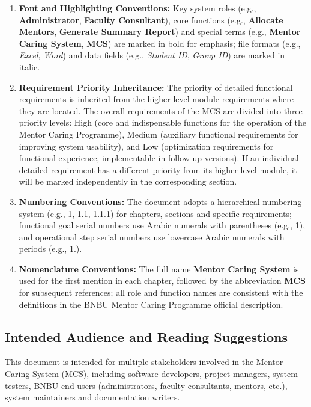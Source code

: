 \begin{enumerate}
\item \textbf{Font and Highlighting Conventions:} Key system roles (e.g., \textbf{Administrator}, \textbf{Faculty Consultant}), core functions (e.g., \textbf{Allocate Mentors}, \textbf{Generate Summary Report}) and special terms (e.g., \textbf{Mentor Caring System}, \textbf{MCS}) are marked in bold for emphasis; file formats (e.g., \textit{Excel}, \textit{Word}) and data fields (e.g., \textit{Student ID}, \textit{Group ID}) are marked in italic.

\item \textbf{Requirement Priority Inheritance:} The priority of detailed functional requirements is inherited from the higher-level module requirements where they are located. The overall requirements of the MCS are divided into three priority levels: High (core and indispensable functions for the operation of the Mentor Caring Programme), Medium (auxiliary functional requirements for improving system usability), and Low (optimization requirements for functional experience, implementable in follow-up versions). If an individual detailed requirement has a different priority from its higher-level module, it will be marked independently in the corresponding section.

\item \textbf{Numbering Conventions:} The document adopts a hierarchical numbering system (e.g., 1, 1.1, 1.1.1) for chapters, sections and specific requirements; functional goal serial numbers use Arabic numerals with parentheses (e.g., 1), and operational step serial numbers use lowercase Arabic numerals with periods (e.g., 1.).

\item \textbf{Nomenclature Conventions:} The full name \textbf{Mentor Caring System} is used for the first mention in each chapter, followed by the abbreviation \textbf{MCS} for subsequent references; all role and function names are consistent with the definitions in the BNBU Mentor Caring Programme official description.
\end{enumerate}

\subsection{Intended Audience and Reading Suggestions}

This document is intended for multiple stakeholders involved in the Mentor Caring System (MCS), including software developers, project managers, system testers, BNBU end users (administrators, faculty consultants, mentors, etc.), system maintainers and documentation writers.

